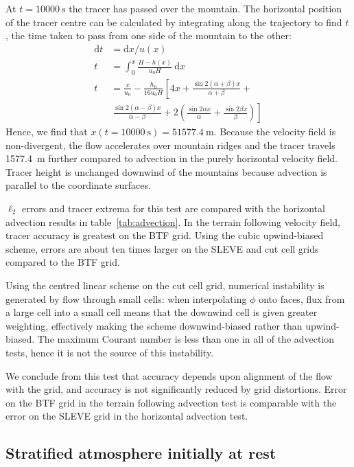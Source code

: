 \documentclass{ametsoc}
\begin{document}
At $t = \SI{10000}{\second}$ the tracer has passed over the mountain.  The horizontal position of the tracer centre can be calculated by integrating along the trajectory to find $t$, the time taken to pass from one side of the mountain to the other:
\begin{align}
	\mathrm{d}t &= \mathrm{d}x / u(x) \\
	t &= \int_0^x \frac{H - h(x)}{u_0 H}\:\mathrm{d}x \\
	t &= \frac{x}{u_0} - \frac{h_0}{16 u_0 H} \left[ 4x + \frac{\sin 2 (\alpha + \beta) x}{\alpha + \beta} \right.+ \nonumber \\
   &\ \left. \frac{\sin 2(\alpha - \beta) x}{\alpha - \beta} + 2 \left( \frac{\sin 2\alpha x}{\alpha} + \frac{\sin 2\beta x}{\beta} \right) \right]
\end{align}
Hence, we find that \(x(t=\SI{10000}{\second}) = \SI{51577.4}{\meter}\).  Because the velocity field is non-divergent, the flow accelerates over mountain ridges and the tracer travels \SI{1577.4}{\meter} further compared to advection in the purely horizontal velocity field.  Tracer height is unchanged downwind of the mountains because advection is parallel to the coordinate surfaces.

$\ell_2$ errors and tracer extrema for this test are compared with the horizontal advection results in table~\ref{tab:advection}.  In the terrain following velocity field, tracer accuracy is greatest on the BTF grid.  Using the cubic upwind-biased scheme, errors are about ten times larger on the SLEVE and cut cell grids compared to the BTF grid.

Using the centred linear scheme on the cut cell grid, numerical instability is generated by flow through small cells: when interpolating \(\phi\) onto faces, flux from a large cell into a small cell means that the downwind cell is given greater weighting, effectively making the scheme downwind-biased rather than upwind-biased.  The maximum Courant number is less than one in all of the advection tests, hence it is not the source of this instability.

We conclude from this test that accuracy depends upon alignment of the flow with the grid, and accuracy is not significantly reduced by grid distortions.  Error on the BTF grid in the terrain following advection test is comparable with the error on the SLEVE grid in the horizontal advection test.

\subsection{Stratified atmosphere initially at rest}
\label{sec:resting}
\end{document}

